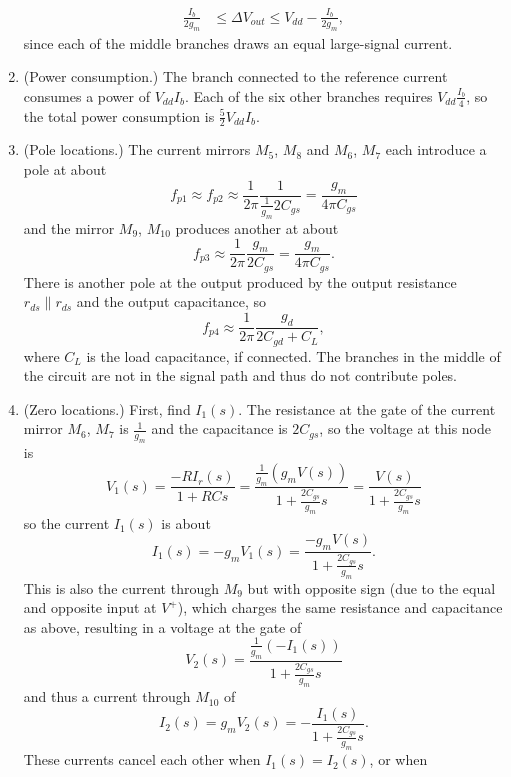 \documentclass{article}
\begin{document}
\begin{enumerate}
{\begin{align*}
        \frac{I_b}{2g_m} &\leq \Delta V_{out} \leq V_{dd} - \frac{I_b}{2g_m},
        \end{align*}
        since each of the middle branches draws an equal large-signal current.
       }
  \item{(Power consumption.)
        The branch connected to the reference current consumes a power of 
        $V_{dd} I_b$. Each of the six other branches requires 
        $V_{dd} \frac{I_b}{4}$, so the total power consumption is 
        $\frac{5}{2} V_{dd} I_b.$
       }
  \item{(Pole locations.)
       The current mirrors $M_5$, $M_8$ and $M_6$, $M_7$ each introduce a pole
       at about
       $$
       f_{p1} \approx f_{p2} \approx 
       \frac{1}{2 \pi} \frac{1}{\frac{1}{g_m} 2 C_{gs}} = \frac{g_m}{4 \pi C_{gs}}
       $$
       and the mirror $M_9$, $M_{10}$ produces another at about
       $$
       f_{p3} \approx \frac{1}{2 \pi}\frac{g_m}{2C_{gs}} = \frac{g_m}{4 \pi C_{gs}}.
       $$
       There is another pole at the output produced by the output resistance
       $r_{ds} \| r_{ds}$ and the output capacitance, so
       $$
       f_{p4} \approx \frac{1}{2\pi}\frac{g_d}{2C_{gd} + C_L},
       $$
       where $C_L$ is the load capacitance, if connected.
       The branches in the middle of the circuit are not in the signal path
       and thus do not contribute poles.
       }
  \item{(Zero locations.)
        First, find $I_1(s)$. The resistance at the gate of the current mirror
        $M_6$, $M_7$ is $\frac{1}{g_m}$ and the capacitance is $2 C_{gs}$, so 
        the voltage at this node is 
        $$
        V_1(s) = \frac{-R I_r(s)}{1 + RCs} 
               = \frac{\frac{1}{g_m} (g_m V(s))}{1 + \frac{2 C_{gs}}{g_m} s}
               = \frac{V(s)}{1 + \frac{2 C_{gs}}{g_m} s}
        $$
        so the current $I_1(s)$ is about
        $$
        I_1(s) = -g_m V_1(s) = \frac{-g_m V(s)}{1 + \frac{2 C_{gs}}{g_m} s}.
        $$
        This is also the current through $M_9$ but with opposite sign 
        (due to the equal and opposite input at $V^{+}$), which 
        charges the same resistance and capacitance as above, resulting in a
        voltage at the gate of
        $$
        V_2(s) = \frac{\frac{1}{g_m} (-I_1(s))}{1 + \frac{2 C_{gs}}{g_m} s}
        $$ 
        and thus a current through $M_{10}$ of
        $$
        I_2(s) = g_m V_2(s) = -\frac{I_1(s)}{1 + \frac{2 C_{gs}}{g_m} s}.
        $$
        These currents cancel each other when $I_1(s) = I_2(s)$, or when
        \begin{align*}

\end{align*}}
\end{enumerate}
\end{document}
